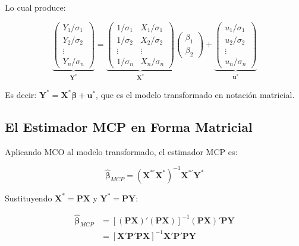 \documentclass[12pt,a4paper]{article}
\begin{document}
Lo cual produce:

\begin{equation}
\underbrace{
\begin{pmatrix} Y_1/\sigma_1 \\ Y_2/\sigma_2 \\ \vdots \\ Y_n/\sigma_n \end{pmatrix}
}_{\mathbf{Y}^*}
=
\underbrace{
\begin{pmatrix} 1/\sigma_1 & X_1/\sigma_1 \\ 1/\sigma_2 & X_2/\sigma_2 \\ \vdots & \vdots \\ 1/\sigma_n & X_n/\sigma_n \end{pmatrix}
}_{\mathbf{X}^*}
\begin{pmatrix} \beta_1 \\ \beta_2 \end{pmatrix}
+
\underbrace{
\begin{pmatrix} u_1/\sigma_1 \\ u_2/\sigma_2 \\ \vdots \\ u_n/\sigma_n \end{pmatrix}
}_{\mathbf{u}^*}
\end{equation}

Es decir: $\mathbf{Y}^* = \mathbf{X}^*\boldsymbol{\beta} + \mathbf{u}^*$, que es el modelo transformado en notación matricial.

\subsection{El Estimador MCP en Forma Matricial}

Aplicando MCO al modelo transformado, el estimador MCP es:

\begin{equation}
\hat{\boldsymbol{\beta}}_{MCP} = (\mathbf{X}^{*'}\mathbf{X}^*)^{-1}\mathbf{X}^{*'}\mathbf{Y}^*
\end{equation}

Sustituyendo $\mathbf{X}^* = \mathbf{P}\mathbf{X}$ y $\mathbf{Y}^* = \mathbf{P}\mathbf{Y}$:

\begin{align}
\hat{\boldsymbol{\beta}}_{MCP} &= \left[(\mathbf{P}\mathbf{X})'(\mathbf{P}\mathbf{X})\right]^{-1}(\mathbf{P}\mathbf{X})'\mathbf{P}\mathbf{Y} \\[8pt]
&= \left[\mathbf{X}'\mathbf{P}'\mathbf{P}\mathbf{X}\right]^{-1}\mathbf{X}'\mathbf{P}'\mathbf{P}\mathbf{Y}
\end{align}
\end{document}
